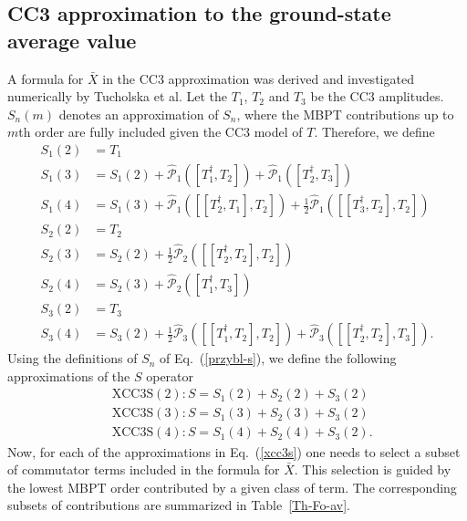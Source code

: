 \documentclass[preprint,12pt]{elsarticle}
\newcommand{\tr}{(3)}
\newcommand{\dr}{(2)}
\newcommand{\equsl}[2]{\begin{equation}\begin{split}\label{#2} #1 \end{split}\end{equation}}
\newcommand{\fr}[1]{Eq.~(\ref{#1})}
\newcommand{\Frt}[1]{Table~\ref{#1}}
\begin{document}
\subsection{CC3 approximation to the ground-state average value}
A formula for  $\bar{X}$ in the CC3 approximation
was  derived and investigated numerically by Tucholska et al.\cite{tucholska2014transition} 
Let the $T_1$, $T_2$ and $T_3$ be the CC3 amplitudes.
$S_n(m)$ denotes an approximation of $S_n$, where the MBPT contributions up to $m$th order
are fully included given the CC3 model of $T$. Therefore, we define
\equsl{
S_1(2) &= T_1   \\
S_1(3) &= S_1\dr +  \hat{\mathscr{P}}_1\left ([T_1^{\dagger}, T_2] \right )  
+ \hat{\mathscr{P}}_1\left ([T_2^{\dagger}, T_3] \right )   \\
S_1(4) &= S_1\tr +  
\hat{\mathscr{P}}_1\left ([[T_2^{\dagger}, T_1], T_2] \right )
+\frac12\hat{\mathscr{P}}_1\left ([[T_3^{\dagger}, T_2], T_2 ]\right )  \\
S_2(2) &= T_2  \\
S_2(3) &= S_2\dr + \frac12\hat{\mathscr{P}}_2\left ([[T_2^{\dagger}, T_2], T_2] \right )   \\
S_2(4) &=  S_2\tr  + \hat{\mathscr{P}}_2\left ([T_1^{\dagger}, T_3] \right )   \\
S_3(2) &= T_3   \\
S _3(4) &=  S_3\dr + \frac12\hat{\mathscr{P}}_3\left ([[T_1^{\dagger}, T_2], T_2] \right )  
+ \hat{\mathscr{P}}_3\left ([[T_2^{\dagger}, T_2], T_3] \right ).
}{przybl-s}
Using the definitions of $S_n$ of \fr{przybl-s}, we define the following approximations of the $S$ operator
\equsl{
&\mathrm{XCC3S(2)}: S = S_1(2) + S_2(2) + S_3(2)\\
&\mathrm{XCC3S(3)}: S = S_1(3) + S_2(3) + S_3(2)\\
&\mathrm{XCC3S(4)}: S = S_1(4) + S_2(4) + S_3(2).
}{xcc3s}
Now, for each of the approximations in \fr{xcc3s} one needs to select a subset of
commutator terms included in the formula for $\bar{X}$. This selection is
guided by the lowest MBPT order contributed by a given class of term. The corresponding
subsets of contributions are summarized in \Frt{Th-Fo-av}.
\end{document}
